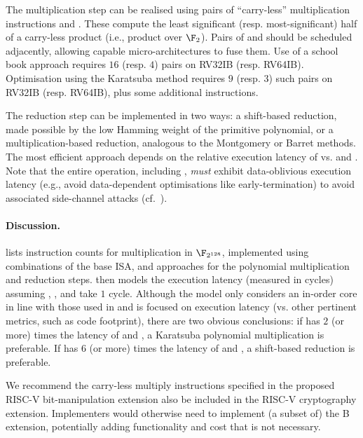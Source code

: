 The multiplication step 
can be realised using pairs of ``carry-less'' multiplication instructions
 and .
These compute the least significant (resp. most-significant) 
half of a carry-less product (i.e., product over $\F_2$).
Pairs of 
 and 
should be scheduled adjacently, allowing capable micro-architectures
to fuse them.
Use of a school book approach 
requires
$16$ (resp. $4$) pairs 
on RV32IB (resp. RV64IB).
Optimisation using the Karatsuba method
requires
$ 9$ (resp. $3$) such pairs 
on RV32IB (resp. RV64IB),
plus some additional  instructions.

The reduction step
can be implemented in two ways:
a shift-based reduction, made possible by the low Hamming weight of the
primitive polynomial,
or
a multiplication-based reduction, analogous to the Montgomery or Barret
methods.
The most efficient approach depends on the relative execution 
latency of
vs.
 and .
Note that the entire  operation, including ,
{\em must} exhibit data-oblivious execution latency 
(e.g., avoid data-dependent optimisations like early-termination)
to avoid associated side-channel attacks (cf.~\cite{GOPT:09}).


\paragraph{Discussion.}

lists instruction counts for 
multiplication in $\F_{2^{128}}$,
implemented using combinations of the base ISA, and approaches
for the polynomial multiplication and reduction steps.
then models the execution latency 
(measured in cycles)
assuming , , and  take $1$ cycle.
Although the model only considers an in-order core in line with those used
in  and is focused on execution latency
(vs. other pertinent metrics, such as code footprint),
there are two obvious conclusions:
if
has $2$ (or more) times the latency of
 and ,
a 
Karatsuba
polynomial multiplication
is preferable.
If
has $6$ (or more) times the latency of
 and ,
a shift-based 
reduction 
is preferable.

We recommend the carry-less multiply instructions
specified in the proposed RISC-V bit-manipulation extension also be included
in the RISC-V cryptography extension.
Implementers would otherwise need to implement (a subset of) the B
extension, potentially adding functionality and cost that is not
necessary.

